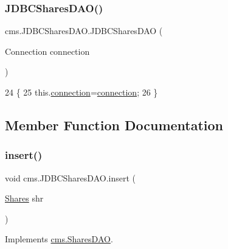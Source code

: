 \subsubsection{\texorpdfstring{J\+D\+B\+C\+Shares\+D\+A\+O()}{JDBCSharesDAO()}}
{\footnotesize\ttfamily cms.\+J\+D\+B\+C\+Shares\+D\+A\+O.\+J\+D\+B\+C\+Shares\+D\+AO (\begin{DoxyParamCaption}\item[{Connection}]{connection }\end{DoxyParamCaption})\hspace{0.3cm}{\ttfamily [inline]}}


\begin{DoxyCode}
24                                                \{
25          this.\mbox{\hyperlink{classcms_1_1_j_d_b_c_shares_d_a_o_a55148864b3f3a771f61d1ac5a2bf841f}{connection}}=\mbox{\hyperlink{classcms_1_1_j_d_b_c_shares_d_a_o_a55148864b3f3a771f61d1ac5a2bf841f}{connection}};
26     \}
\end{DoxyCode}


\subsection{Member Function Documentation}
\mbox{\label{classcms_1_1_j_d_b_c_shares_d_a_o_a085c86e21861e14636c1e213ee522cbd}} 
\subsubsection{\texorpdfstring{insert()}{insert()}}
{\footnotesize\ttfamily void cms.\+J\+D\+B\+C\+Shares\+D\+A\+O.\+insert (\begin{DoxyParamCaption}\item[{\mbox{\hyperlink{classcms_1_1_shares}{Shares}}}]{shr }\end{DoxyParamCaption})\hspace{0.3cm}{\ttfamily [inline]}}



Implements \mbox{\hyperlink{interfacecms_1_1_shares_d_a_o_aa2eeea0c51b4883c652c5aa396f0d316}{cms.\+Shares\+D\+AO}}.


